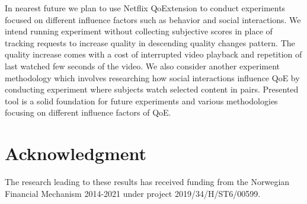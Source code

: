 \documentclass[conference]{IEEEtran}
\begin{document}
In nearest future we plan to use Netflix QoExtension to conduct experiments focused on different influence factors such as behavior and social interactions. We intend running experiment without collecting subjective scores in place of tracking requests to increase quality in descending quality changes pattern. The quality increase comes with a cost of interrupted video playback and repetition of last watched few seconds of the video.
We also consider another experiment methodology which involves researching how social interactions influence QoE by conducting experiment where subjects watch selected content in pairs.
Presented tool is a solid foundation for future experiments and various methodologies focusing on different influence factors of QoE.

\section*{Acknowledgment}
The research leading to these results has received funding from the Norwegian Financial Mechanism 2014-2021 under project 2019/34/H/ST6/00599.

\printbibliography
\end{document}
